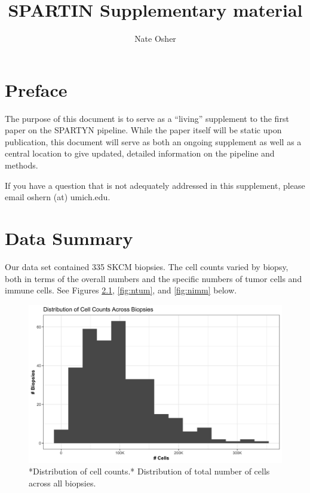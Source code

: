 \documentclass[
]{book}
\title{SPARTIN Supplementary material}
\author{Nate Osher}
\date{}
\begin{document}
\maketitle

{
\setcounter{tocdepth}{1}
\tableofcontents
}
\newcommand{\vb}[1]{\textcolor{blue}{\textsf{#1}}}
\newcommand{\no}[1]{\textcolor{red}{\textsf{[#1]}}}
\newcommand{\jk}[1]{\textcolor{violet}{\textsf{[JK: #1]}}}
\newcommand{\bs}[1]{{\boldsymbol{#1}}}
\newcommand{\bm}[1]{{\mathbf{#1}}}

\hypertarget{preface}{%
\chapter{Preface}\label{preface}}

The purpose of this document is to serve as a ``living'' supplement to the
first paper on the SPARTYN pipeline. While the paper itself will be
static upon publication, this document will serve as both an ongoing
supplement as well as a central location to give updated, detailed
information on the pipeline and methods.

If you have a question that is not adequately addressed in this
supplement, please email oshern (at) umich.edu.

\hypertarget{data-summary}{%
\chapter{Data Summary}\label{data-summary}}

Our data set contained 335 SKCM biopsies. The cell counts varied by biopsy, both in terms of the overall numbers and the specific numbers of tumor cells and immune cells. See Figures \ref{fig:ncells}, \ref{fig:ntum}, and \ref{fig:nimm} below.

\begin{figure}

{\centering \includegraphics[width=1\linewidth]{Figures/n_cells} 

}

\caption{*Distribution of cell counts.* Distribution of total number of cells across all biopsies.}\label{fig:ncells}
\end{figure}
\end{document}
